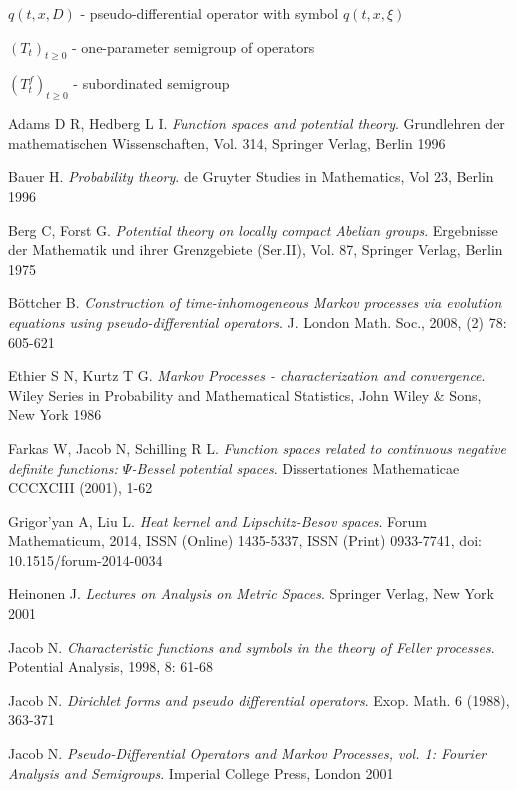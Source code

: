 \documentclass[a4paper, 12pt]{report}
\theoremstyle{remark}
\theoremstyle{definition}
\begin{document}
\noindent$q(t, x, D)$ - pseudo-differential operator with symbol $q(t, x, \xi)$

\noindent$(T_t)_{t \ge 0}$ - one-parameter semigroup of operators

\noindent$(T_t^f)_{t \ge 0}$ - subordinated semigroup





\begin{thebibliography}{99}

 Adams D R, Hedberg L I.  \emph{Function spaces and potential theory}.  Grundlehren der mathematischen Wissenschaften, Vol. 314, Springer Verlag, Berlin 1996

 Bauer H.  \emph{Probability theory}. de Gruyter Studies in Mathematics, Vol 23, Berlin 1996

 Berg C, Forst G.  \emph{Potential theory on locally compact Abelian groups}.  Ergebnisse der Mathematik und ihrer Grenzgebiete (Ser.II), Vol. 87, Springer Verlag, Berlin 1975

 B\"ottcher B.  \emph{Construction of time-inhomogeneous Markov processes via evolution equations using pseudo-differential operators}.  J. London Math. Soc., 2008, (2) 78: 605-621

 Ethier S N, Kurtz T G.  \emph{Markov Processes - characterization and convergence}.  Wiley Series in Probability and Mathematical Statistics, John Wiley \& Sons, New York 1986

 Farkas W, Jacob N, Schilling R L.  \emph{Function spaces related to continuous negative definite functions: $\Psi$-Bessel potential spaces}.  Dissertationes Mathematicae CCCXCIII (2001), 1-62

 Grigor'yan A, Liu L.  \emph{Heat kernel and Lipschitz-Besov spaces}.  Forum Mathematicum, 2014, ISSN (Online) 1435-5337, ISSN (Print) 0933-7741, doi: 10.1515/forum-2014-0034

 Heinonen J.  \emph{Lectures on Analysis on Metric Spaces}.  Springer Verlag, New York 2001

 Jacob N.  \emph{Characteristic functions and symbols in the theory of Feller processes}.  Potential Analysis, 1998, 8: 61-68

 Jacob N.  \emph{Dirichlet forms and pseudo differential operators}.  Exop. Math. 6 (1988), 363-371

 Jacob N.  \emph{Pseudo-Differential Operators and Markov Processes, vol. 1: Fourier Analysis and Semigroups}.  Imperial College Press, London 2001


\end{thebibliography}
\end{document}
